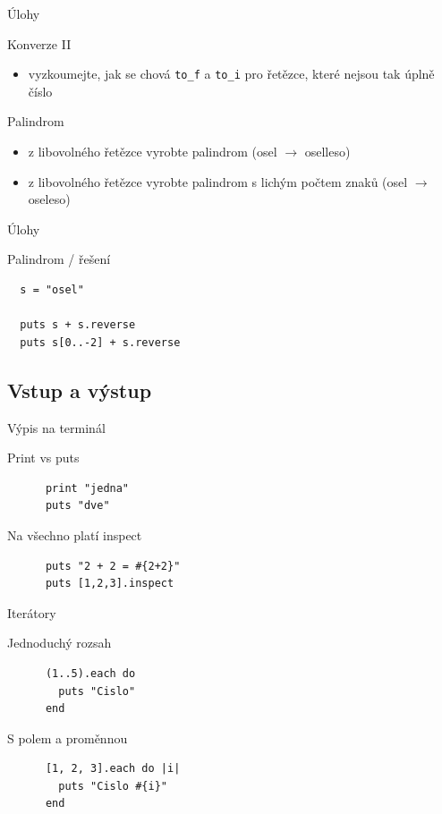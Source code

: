 \documentclass{beamer}
\begin{document}
\begin{frame}[fragile]{Úlohy}
  \begin{block}{Konverze II}
    \begin{itemize}
      \item vyzkoumejte, jak se chová \texttt{to\_f} a \texttt{to\_i} pro řetězce, které nejsou tak úplně číslo
    \end{itemize}
  \end{block}
  \pause
  \begin{block}{Palindrom}
    \begin{itemize}
      \item z libovolného řetězce vyrobte palindrom (osel $\to$ oselleso)
      \item z libovolného řetězce vyrobte palindrom s lichým počtem znaků (osel $\to$ oseleso)
    \end{itemize}
  \end{block}
\end{frame}

\begin{frame}[fragile]{Úlohy}
  \begin{block}{Palindrom / řešení}
\begin{verbatim}
  s = "osel"

  puts s + s.reverse
  puts s[0..-2] + s.reverse
\end{verbatim}
  \end{block}
\end{frame}

\subsection{Vstup a výstup}

\begin{frame}[fragile]{Výpis na terminál}
  \begin{block}{Print vs puts}
    \begin{verbatim}
      print "jedna"
      puts "dve"
    \end{verbatim}
  \end{block}
  \pause
  \begin{block}{Na všechno platí inspect}
    \begin{verbatim}
      puts "2 + 2 = #{2+2}"
      puts [1,2,3].inspect
    \end{verbatim}
  \end{block}
\end{frame}

\begin{frame}[fragile]{Iterátory}
  \begin{block}{Jednoduchý rozsah}
    \begin{verbatim}
      (1..5).each do
        puts "Cislo"
      end
    \end{verbatim}
  \end{block}
  \pause
  \begin{block}{S polem a proměnnou}
    \begin{verbatim}
      [1, 2, 3].each do |i|
        puts "Cislo #{i}"
      end
    \end{verbatim}
  \end{block}
\end{frame}
\end{document}
